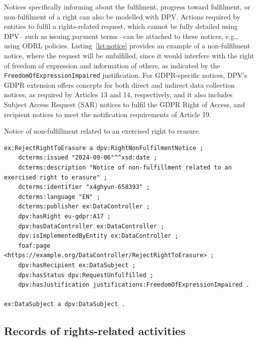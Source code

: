 \documentclass{IOS-Book-Article}     %
\begin{document}
Notices specifically informing about the fulfilment, progress toward fulfilment, or non-fulfilment of a right can also be modelled with DPV.
Actions required by entities to fulfil a rights-related request, which cannot be fully detailed using DPV-- such as issuing payment terms --can be attached to these notices, e.g., using ODRL policies.
Listing~\ref{lst:notice} provides an example of a non-fulfilment notice, where the request will be unfulfilled, since it would interfere with the right of freedom of expression and information of others, as indicated by the \texttt{FreedomOfExpressionImpaired} justification.
For GDPR-specific notices, DPV's GDPR extension offers concepts for both direct and indirect data collection notices, as required by Articles 13 and 14, respectively, and it also includes Subject Access Request (SAR) notices to fulfil the GDPR Right of Access, and recipient notices to meet the notification requirements of Article 19.

\begin{listing}[ht]
\caption{Notice of non-fulfillment related to an exercised right to erasure.}
\label{lst:notice}
\begin{verbatim}
ex:RejectRightToErasure a dpv:RightNonFulfilmentNotice ;
    dcterms:issued "2024-09-06"^^xsd:date ;
    dcterms:description "Notice of non-fulfillment related to an exercised right to erasure" ;
    dcterms:identifier "x4ghyun-658393" ;
    dcterms:language "EN" ;
    dcterms:publisher ex:DataController ;
    dpv:hasRight eu-gdpr:A17 ;
    dpv:hasDataController ex:DataController ;
    dpv:isImplementedByEntity ex:DataController ;
    foaf:page <https://example.org/DataController/RejectRightToErasure> ;
    dpv:hasRecipient ex:DataSubject ;
    dpv:hasStatus dpv:RequestUnfulfilled ;
    dpv:hasJustification justifications:FreedomOfExpressionImpaired .

ex:DataSubject a dpv:DataSubject .
\end{verbatim}
\end{listing}

\subsection{Records of rights-related activities}
\label{sec:records}
\end{document}
